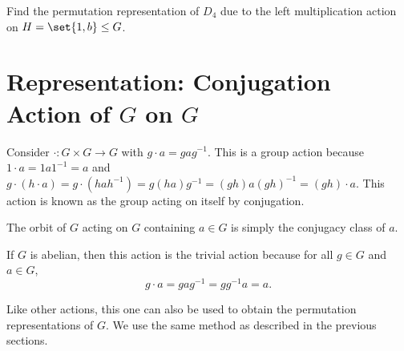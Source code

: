 \documentclass[11pt]{penrose}
\begin{document}
\begin{nex}
    Find the permutation representation of $D_{4}$ due to the left multiplication action on $H = \set{1, b} \subgroup G$.
\end{nex}

\section{Representation: Conjugation Action of \texorpdfstring{$G$}{G} on \texorpdfstring{$G$}{G}}

Consider $\cdot : G \times G \to G$ with $g \cdot a = gag^{-1}$. This is a group action because $1 \cdot a = 1a1^{-1} = a$ and $g \cdot (h \cdot a) = g \cdot (hah^{-1}) = g(ha)g^{-1} = (gh)a(gh)^{-1} = (gh) \cdot a$. This action is known as the group acting on itself by conjugation.

The orbit of $G$ acting on $G$ containing $a \in G$ is simply the conjugacy class of $a$.

\begin{remark}
    If $G$ is abelian, then this action is the trivial action because for all $g \in G$ and $a \in G$,
    \begin{equation*}
        g \cdot a = g a g^{-1} = g g^{-1} a = a.
    \end{equation*}
\end{remark}

Like other actions, this one can also be used to obtain the permutation representations of $G$. We use the same method as described in the previous sections.
\end{document}
